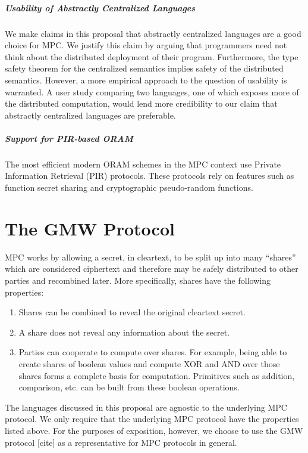 \documentclass{report}
\begin{document}
\paragraph{Usability of Abstractly Centralized Languages}
We make claims in this proposal that abstractly centralized languages are a good choice for MPC. We justify this claim by arguing that
programmers need not think about the distributed deployment of their program. Furthermore, the type safety theorem for the centralized
semantics implies safety of the distributed semantics. However, a more empirical approach to the question of usability is warranted.
A user study comparing two languages, one of which exposes more of the distributed computation, would lend more credibility to our claim
that abstractly centralized languages are preferable.

\paragraph{Support for PIR-based ORAM}
The most efficient modern ORAM schemes in the MPC context use Private Information Retrieval (PIR) protocols. These protocols rely on
features such as function secret sharing and cryptographic pseudo-random functions.

\appendix

\chapter{The GMW Protocol}
\label{ch:gmw}

MPC works by allowing a secret, in cleartext, to be split up into many ``shares'' which are considered ciphertext
and therefore may be safely distributed to other parties and recombined later. More specifically, shares have the following properties:
\begin{enumerate}
\item Shares can be combined to reveal the original cleartext secret.
\item A share does not reveal any information about the secret.
\item Parties can cooperate to compute over shares. For example, being able to create shares of boolean values
  and compute XOR and AND over those shares forms a complete basis for computation. Primitives such as addition,
  comparison, etc. can be built from these boolean operations.
\end{enumerate}

The languages discussed in this proposal are agnostic to the underlying MPC protocol. We only require that the underlying MPC protocol
have the properties listed above. For the purposes of exposition, however, we choose to use the GMW protocol [cite] as a
representative for MPC protocols in general.
\end{document}
